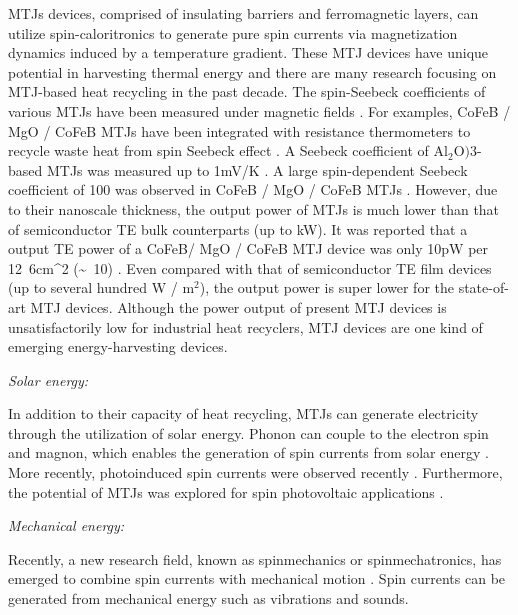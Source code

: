 \documentclass[molecules,review,submit,pdftex,moreauthors]{Definitions/mdpi}
\begin{document}
MTJs devices, comprised of insulating barriers and ferromagnetic layers, can utilize spin-caloritronics to generate pure spin currents via magnetization dynamics induced by a temperature gradient.  These MTJ devices have unique potential in  harvesting thermal energy and there are many research focusing on MTJ-based heat recycling in the past decade.  The spin-Seebeck coefficients of various MTJs have been measured under magnetic fields \cite{Liebing2012JAP,Bohnert2017PRB,Liebing2013APL,Shan2015PRB,Walter2011NM,Boehnke2013RSI,Huebner2016PRB}.   For examples, CoFeB / MgO / CoFeB MTJs have been integrated with resistance thermometers to recycle waste heat from spin Seebeck effect \cite{Bauer2012NM}.  A Seebeck coefficient of Al$_2$O$)3$-based MTJs was measured up to \unit{1}{mV/K} \cite{Lin2012NC}.  A large spin-dependent Seebeck coefficient of \unit{100}{\micro\volt\per\kelvin} was observed in CoFeB / MgO / CoFeB MTJs \cite{Liebing2011PRL}.  However, due to their nanoscale thickness, the output power of MTJs is much lower than that of semiconductor TE bulk counterparts (up to kW).  It was reported that a output TE power of a CoFeB/ MgO / CoFeB MTJ device was only \unit{10}{pW} per \unit{12.6}{cm^2} (\unit{\sim 10}{\nano\watt\per\meter\squared}) \cite{Bohnert2018PLa}.  Even compared with that of semiconductor TE film devices (up to several hundred W / m$^2$), the output power is super lower for the state-of-art MTJ devices.  Although the power output of present MTJ devices is unsatisfactorily low for industrial heat recyclers, MTJ devices are one kind of emerging energy-harvesting devices. 



\noindent \emph{Solar energy:}


In addition to their capacity of heat recycling, MTJs can generate electricity through the utilization of solar energy.  Phonon can couple to the electron spin and magnon, which enables the generation of spin currents from solar energy \cite{Puebla2020CM}.  More recently, photoinduced spin currents were observed recently \cite{Otani2017NP}.  Furthermore, the potential of MTJs was explored for spin photovoltaic applications \cite{Ellsworth2016NP}.


\noindent \emph{Mechanical energy:}


Recently, a new research field, known as spinmechanics or spinmechatronics, has emerged to combine spin currents with mechanical motion \cite{Otani2017NP}. Spin currents can be generated from mechanical energy such as vibrations and sounds. \cite{Weiler2012PRL,Xu2018PRB} 
\end{document}
